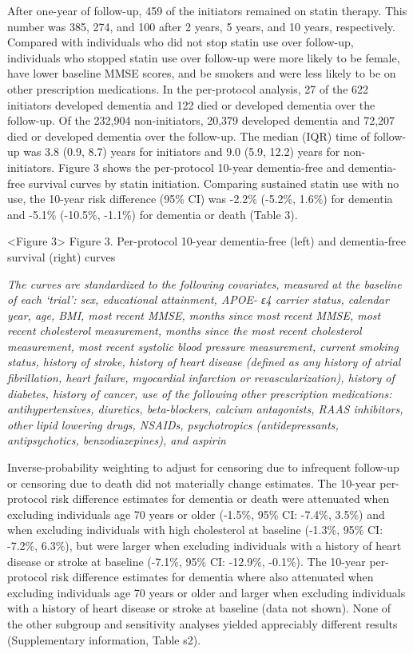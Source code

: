 \documentclass[
]{book}
\begin{document}
After one-year of follow-up, 459 of the initiators remained on statin therapy. This number was 385, 274, and 100 after 2 years, 5 years, and 10 years, respectively. Compared with individuals who did not stop statin use over follow-up, individuals who stopped statin use over follow-up were more likely to be female, have lower baseline MMSE scores, and be smokers and were less likely to be on other prescription medications. In the per-protocol analysis, 27 of the 622 initiators developed dementia and 122 died or developed dementia over the follow-up. Of the 232,904 non-initiators, 20,379 developed dementia and 72,207 died or developed dementia over the follow-up. The median (IQR) time of follow-up was 3.8 (0.9, 8.7) years for initiators and 9.0 (5.9, 12.2) years for non-initiators. Figure 3 shows the per-protocol 10-year dementia-free and dementia-free survival curves by statin initiation. Comparing sustained statin use with no use, the 10-year risk difference (95\% CI) was -2.2\% (-5.2\%, 1.6\%) for dementia and -5.1\% (-10.5\%, -1.1\%) for dementia or death (Table 3).

\textless Figure 3\textgreater{}
Figure 3. Per-protocol 10-year dementia-free (left) and dementia-free survival (right) curves

\emph{The curves are standardized to the following covariates, measured at the baseline of each `trial': sex, educational attainment, APOE- ε4 carrier status, calendar year, age, BMI, most recent MMSE, months since most recent MMSE, most recent cholesterol measurement, months since the most recent cholesterol measurement, most recent systolic blood pressure measurement, current smoking status, history of stroke, history of heart disease (defined as any history of atrial fibrillation, heart failure, myocardial infarction or revascularization), history of diabetes, history of cancer, use of the following other prescription medications: antihypertensives, diuretics, beta-blockers, calcium antagonists, RAAS inhibitors, other lipid lowering drugs, NSAIDs, psychotropics (antidepressants, antipsychotics, benzodiazepines), and aspirin}

Inverse-probability weighting to adjust for censoring due to infrequent follow-up or censoring due to death did not materially change estimates. The 10-year per-protocol risk difference estimates for dementia or death were attenuated when excluding individuals age 70 years or older (-1.5\%, 95\% CI: -7.4\%, 3.5\%) and when excluding individuals with high cholesterol at baseline (-1.3\%, 95\% CI: -7.2\%, 6.3\%), but were larger when excluding individuals with a history of heart disease or stroke at baseline (-7.1\%, 95\% CI: -12.9\%, -0.1\%). The 10-year per-protocol risk difference estimates for dementia where also attenuated when excluding individuals age 70 years or older and larger when excluding individuals with a history of heart disease or stroke at baseline (data not shown). None of the other subgroup and sensitivity analyses yielded appreciably different results (Supplementary information, Table s2).
\end{document}

